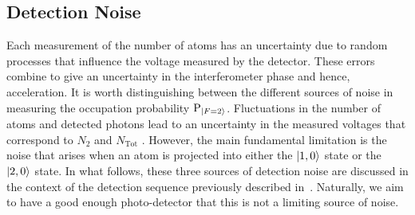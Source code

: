 \subsection{Detection Noise}\label{subsec:detection_noise}

Each measurement of the number of atoms has an uncertainty due to
random processes that influence the voltage measured by the detector. These errors
combine to give an uncertainty in the interferometer phase and
hence, acceleration. It is worth distinguishing between the different
sources of noise in measuring the occupation probability
$\text{P}_{\ket{F=2}}$. Fluctuations in the number of atoms and detected
photons lead to an uncertainty in the measured voltages that
correspond to $N_2$ and $N_\text{Tot}$ 
\nocite{Rocco2014}. However, the main fundamental limitation
is the noise that arises when an atom is projected into either the
$\ket{1,0}$ state or the $\ket{2,0}$ state. In what follows, these
three sources of detection noise are discussed in the context of the
detection sequence previously described
in~. Naturally, we aim to have a
good enough photo-detector that this is not a limiting source of
noise.
